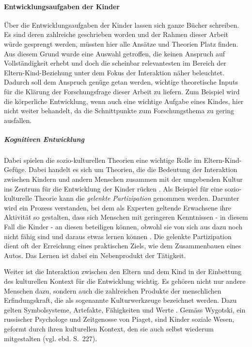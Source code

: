\paragraph{Entwicklungsaufgaben der Kinder}\label{sec:Entwicklungsaufgaben} Über die Entwicklungsaufgaben der Kinder lassen sich ganze Bücher schreiben. Es sind deren zahlreiche geschrieben worden und der Rahmen dieser Arbeit würde gesprengt werden, müssten hier alle Ansätze und Theorien Platz finden. Aus diesem Grund wurde eine Auswahl getroffen, die keinen Anspruch auf Vollständigkeit erhebt und doch die scheinbar relevantesten im Bereich der Eltern-Kind-Beziehung unter dem Fokus der Interaktion näher beleuchtet. Dadurch soll dem Anspruch genüge getan werden, wichtige theoretische Inputs für die Klärung der Forschungsfrage dieser Arbeit zu liefern. Zum Beispiel wird die körperliche Entwicklung, wenn auch eine wichtige Aufgabe eines Kindes, hier nicht weiter behandelt, da die Schnittpunkte zum Forschungsthema zu gering ausfallen.

\subparagraph{Kognitiven Entwicklung}\label{par:KognitiveEntwicklung}
Dabei spielen die sozio-kulturellen Theorien eine wichtige Rolle im Eltern-Kind-Gefüge. Dabei handelt es sich um Theorien, die die Bedeutung der Interaktion zwischen Kindern und andern Menschen zusammen mit der umgebenden Kultur ins Zentrum für die Entwicklung der Kinder rücken \cite[S.~225ff]{Siegler2008}. Als Beispiel für eine sozio-kulturelle Theorie kann die \textit{gelenkte Partizipation} genommen werden. Darunter wird ein Prozess verstanden, bei dem als Experten geltende Erwachsene ihre Aktivität so gestalten, dass sich Menschen mit geringeren Kenntnissen - in diesem Fall die Kinder - an diesen beteiligen können, obwohl sie von sich aus dazu noch nicht fähig sind und daraus etwas lernen können \cite{Rogoff1990}. Die gelenkte Partizipation dient oft der Erreichung eines praktischen Ziels, wie dem Zusammenbauen eines Autos. Das Lernen ist dabei ein Nebenprodukt der Tätigkeit.

Weiter ist die Interaktion zwischen den Eltern und dem Kind in der Einbettung des kulturellen Kontext für die Entwicklung wichtig. Es gehören nicht nur andere Menschen dazu, sondern auch die zahlreichen Produkte der menschlichen Erfindungskraft, die als sogenannte Kulturwerkzeuge bezeichnet werden. Dazu gelten Symbolsysteme, Artefakte, Fähigkeiten und Werte \cite[S.~226]{Siegler2008}. Gemäss Wygotski, ein russischer Psychologe und Zeitgenosse von Piaget, sind Kinder soziale Wesen, geformt durch ihren kulturellen Kontext, den sie auch selbst wiederum mitgestalten (vgl. ebd. S.~227). 

